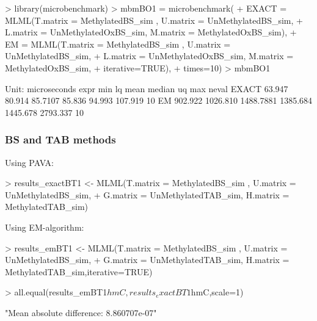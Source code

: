\documentclass{article}
\begin{document}
\begin{Schunk}
\begin{Sinput}
>  library(microbenchmark)
>  mbmBO1 = microbenchmark(
+     EXACT = MLML(T.matrix = MethylatedBS_sim , U.matrix = UnMethylatedBS_sim,
+                  L.matrix = UnMethylatedOxBS_sim, M.matrix = MethylatedOxBS_sim),
+     EM =    MLML(T.matrix = MethylatedBS_sim , U.matrix = UnMethylatedBS_sim,
+                  L.matrix = UnMethylatedOxBS_sim, M.matrix = MethylatedOxBS_sim,
+                  iterative=TRUE),
+     times=10)
>  mbmBO1
\end{Sinput}
\begin{Soutput}
Unit: microseconds
  expr     min       lq      mean   median       uq      max neval
 EXACT  63.947   80.914   85.7107   85.836   94.993  107.919    10
    EM 902.922 1026.810 1488.7881 1385.684 1445.678 2793.337    10
\end{Soutput}
\end{Schunk}


\subsubsection{BS and TAB methods}

Using PAVA:
\begin{Schunk}
\begin{Sinput}
> results_exactBT1 <- MLML(T.matrix = MethylatedBS_sim , U.matrix = UnMethylatedBS_sim,
+ G.matrix = UnMethylatedTAB_sim, H.matrix = MethylatedTAB_sim)
\end{Sinput}
\end{Schunk}

Using EM-algorithm:
\begin{Schunk}
\begin{Sinput}
>  results_emBT1 <- MLML(T.matrix = MethylatedBS_sim , U.matrix = UnMethylatedBS_sim,
+  G.matrix = UnMethylatedTAB_sim, H.matrix = MethylatedTAB_sim,iterative=TRUE)
\end{Sinput}
\end{Schunk}


\begin{Schunk}
\begin{Sinput}
>  all.equal(results_emBT1$hmC,results_exactBT1$hmC,scale=1)
\end{Sinput}
\begin{Soutput}
[1] "Mean absolute difference: 8.860707e-07"
\end{Soutput}
\end{Schunk}
\end{document}
